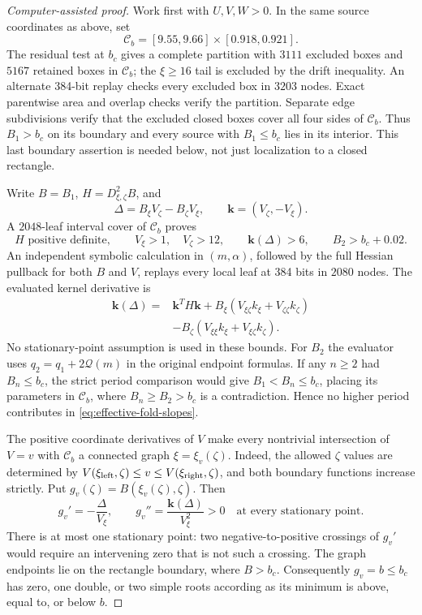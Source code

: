 \documentclass[11pt,a4paper]{article}
\theoremstyle{remark}\newtheorem{remark}[theorem]{Remark}
\begin{document}
\begin{proof}[Computer-assisted proof]
Work first with $U,V,W>0$. In the same source coordinates as above,
set
\[
 \mathcal C_b=[9.55,9.66]\times[0.918,0.921].
\]
The residual test at $b_c$ gives a complete partition with $3111$
excluded boxes and $5167$ retained boxes in $\mathcal C_b$; the
$\xi\ge16$ tail is excluded by the drift inequality. An alternate
384-bit replay checks every excluded box in $3203$ nodes. Exact
parentwise area and overlap checks verify the partition. Separate
edge subdivisions verify that the excluded closed boxes cover all
four sides of $\mathcal C_b$. Thus $B_1>b_c$ on its boundary and
every source with $B_1\le b_c$ lies in its interior. This last
boundary assertion is needed below, not just localization to a
closed rectangle.

Write $B=B_1$, $H=D^2_{\xi,\zeta}B$, and
\[
 \Delta=B_\xi V_\zeta-B_\zeta V_\xi,\qquad
 \mathbf k=(V_\zeta,-V_\xi).
\]
A $2048$-leaf interval cover of $\mathcal C_b$ proves
\[
 H\text{ positive definite},\qquad V_\xi>1,\quad V_\zeta>12,
 \qquad \mathbf k(\Delta)>6,\qquad B_2>b_c+0.02.
\]
An independent symbolic calculation in $(m,\alpha)$, followed by
the full Hessian pullback for both $B$ and $V$, replays every local
leaf at 384 bits in $2080$ nodes. The evaluated kernel derivative is
\[
 \begin{split}
 \mathbf k(\Delta)={}&\mathbf k^TH\mathbf k
 +B_\xi(V_{\xi\zeta}k_\xi+V_{\zeta\zeta}k_\zeta)\\
 &-B_\zeta(V_{\xi\xi}k_\xi+V_{\xi\zeta}k_\zeta).
 \end{split}
\]
No stationary-point assumption is used in these bounds. For $B_2$
the evaluator uses $q_2=q_1+2\mathcal Q(m)$ in the original
endpoint formulas. If any $n\ge2$ had $B_n\le b_c$, the strict
period comparison would give $B_1<B_n\le b_c$, placing its
parameters in $\mathcal C_b$, where $B_n\ge B_2>b_c$ is a
contradiction. Hence no higher period contributes in
\eqref{eq:effective-fold-slopes}.

The positive coordinate derivatives of $V$ make every nontrivial
intersection of $V=v$ with $\mathcal C_b$ a connected graph
$\xi=\xi_v(\zeta)$. Indeed, the allowed $\zeta$ values are determined
by $V(\xi_{\rm left},\zeta)\le v\le
V(\xi_{\rm right},\zeta)$, and both boundary functions increase
strictly. Put $g_v(\zeta)=B(\xi_v(\zeta),\zeta)$. Then
\[
 g_v'=-\frac{\Delta}{V_\xi},\qquad
 g_v''=\frac{\mathbf k(\Delta)}{V_\xi^2}>0
 \quad\text{at every stationary point.}
\]
There is at most one stationary point: two negative-to-positive
crossings of $g_v'$ would require an intervening zero that is not
such a crossing. The graph endpoints lie on the rectangle boundary,
where $B>b_c$. Consequently $g_v=b\le b_c$ has zero, one double,
or two simple roots according as its minimum is above, equal to,
or below $b$.


\end{proof}
\end{document}
